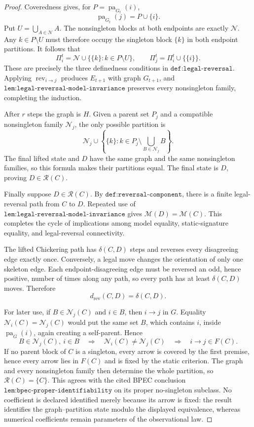 \documentclass{article}
\begin{document}
\begin{proof}
Coveredness gives, for \(P=\operatorname{pa}_{G_t}(i)\),
\[
 \operatorname{pa}_{G_t}(j)=P\cup\{i\}.
\]
Put \(U=\bigcup_{A\in\mathcal N}A\). The nonsingleton blocks at both endpoints are exactly \(\mathcal N\). Any \(k\in P\setminus U\) must therefore occupy the singleton block \(\{k\}\) in both endpoint partitions. It follows that
\[
 \Pi^t_i=\mathcal N\cup\{\{k\}:k\in P\setminus U\},
 \qquad
 \Pi^t_j=\Pi^t_i\cup\{\{i\}\}.
\]
These are precisely the three definedness conditions in \(\texttt{def:legal-reversal}\). Applying \(\operatorname{rev}_{i\to j}\) produces \(E_{t+1}\) with graph \(G_{t+1}\), and \(\texttt{lem:legal-reversal-model-invariance}\) preserves every nonsingleton family, completing the induction.

After \(r\) steps the graph is \(H\). Given a parent set \(P_j\) and a compatible nonsingleton family \(\mathcal N_j\), the only possible partition is
\[
 \mathcal N_j\cup
 \left\{\{k\}:k\in P_j\setminus\bigcup_{B\in\mathcal N_j}B\right\}.
\]
The final lifted state and \(D\) have the same graph and the same nonsingleton families, so this formula makes their partitions equal. The final state is \(D\), proving \(D\in\mathcal R(C)\).

Finally suppose \(D\in\mathcal R(C)\). By \(\texttt{def:reversal-component}\), there is a finite legal-reversal path from \(C\) to \(D\). Repeated use of \(\texttt{lem:legal-reversal-model-invariance}\) gives \(\mathcal M(D)=\mathcal M(C)\). This completes the cycle of implications among model equality, static-signature equality, and legal-reversal connectivity.

The lifted Chickering path has \(\delta(C,D)\) steps and reverses every disagreeing edge exactly once. Conversely, a legal move changes the orientation of only one skeleton edge. Each endpoint-disagreeing edge must be reversed an odd, hence positive, number of times along any path, so every path has at least \(\delta(C,D)\) moves. Therefore
\[
 d_{\mathrm{rev}}(C,D)=\delta(C,D).
\]

For later use, if \(B\in\mathcal N_j(C)\) and \(i\in B\), then \(i\to j\) in \(G\). Equality \(\mathcal N_i(C)=\mathcal N_j(C)\) would put the same set \(B\), which contains \(i\), inside \(\operatorname{pa}_G(i)\), again creating a self-parent. Hence
\[
 B\in\mathcal N_j(C),\ i\in B
 \quad\Longrightarrow\quad
 \mathcal N_i(C)\neq\mathcal N_j(C)
 \quad\Longrightarrow\quad
 i\to j\in F(C).
\]
If no parent block of \(C\) is a singleton, every arrow is covered by the first premise, hence every arrow lies in \(F(C)\) and is fixed by the static criterion. The graph and every nonsingleton family then determine the whole partition, so \(\mathcal R(C)=\{C\}\). This agrees with the cited BPEC conclusion \(\texttt{lem:bpec-proper-identifiability}\) on its proper no-singleton subclass. No coefficient is declared identified merely because its arrow is fixed: the result identifies the graph--partition state modulo the displayed equivalence, whereas numerical coefficients remain parameters of the observational law.
\end{proof}
\end{document}

